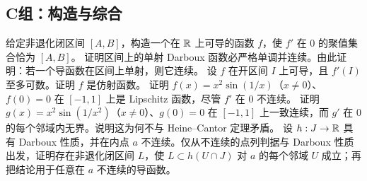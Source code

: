 \subsection*{C组：构造与综合}
\begin{enumerate}[label=\textbf{\thechapter.\arabic*.},resume]
  给定非退化闭区间 \([A,B]\)，构造一个在 \(\mathbb{R}\) 上可导的函数 \(f\)，使 \(f'\) 在 \(0\) 的聚值集合恰为 \([A,B]\)。
  证明区间上的单射 Darboux 函数必严格单调并连续。由此证明：若一个导函数在区间上单射，则它连续。
  设 \(f\) 在开区间 \(I\) 上可导，且 \(f'(I)\) 至多可数。证明 \(f\) 是仿射函数。
  证明 \(f(x)=x^2\sin(1/x)\)（\(x\ne0\)）、\(f(0)=0\) 在 \([-1,1]\) 上是 Lipschitz 函数，尽管 \(f'\) 在 \(0\) 不连续。
  证明 \(g(x)=x^2\sin(1/x^2)\)（\(x\ne0\)）、\(g(0)=0\) 在 \([-1,1]\) 上一致连续，而 \(g'\) 在 \(0\) 的每个邻域内无界。说明这为何不与 Heine--Cantor 定理矛盾。
  设 \(h:J\to\mathbb{R}\) 具有 Darboux 性质，并在内点 \(a\) 不连续。仅从不连续的点列判据与 Darboux 性质出发，证明存在非退化闭区间 \(L\)，使 \(L\subset h(U\cap J)\) 对 \(a\) 的每个邻域 \(U\) 成立；再把结论用于任意在 \(a\) 不连续的导函数。
\end{enumerate}
